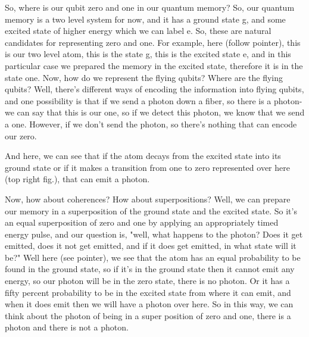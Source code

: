 So, where is our qubit zero and one in our quantum memory? So, our quantum memory is a two level system for now, and it has a ground state g, and some excited state of higher energy which we can label e. So, these are natural candidates for representing zero and one. For example, here (follow pointer), this is our two level atom, this is the state g, this is the excited state e, and in this particular case we prepared the memory in the excited state, therefore it is in the state one. Now, how do we represent the flying qubits? Where are the flying qubits? Well, there's different ways of encoding the information into flying qubits, and one possibility is that if we send a photon down a fiber, so there is a photon- we can say that this is our one, so if we detect this photon, we know that we send a one. However, if we don't send the photon, so there's nothing that can encode our zero.

And here, we can see that if the atom decays from the excited state into its ground state or if it makes a transition from one to zero represented over here (top right fig.), that can emit a photon.

Now, how about coherences? How about superpositions? Well, we can prepare our memory in a superposition of the ground state and the excited state. So it's an equal superposition of zero and one by applying an appropriately timed energy pulse, and our question is, "well, what happens to the photon? Does it get emitted, does it not get emitted, and if it does get emitted, in what state will it be?" Well here (see pointer), we see that the atom has an equal probability to be found in the ground state, so if it's in the ground state then it cannot emit any energy, so our photon will be in the zero state, there is no photon. Or it has a fifty percent probability to be in the excited state from where it can emit, and when it does emit then we will have a photon over here. So in this way, we can think about the photon of being in a super position of zero and one, there is a photon and there is not a photon.

